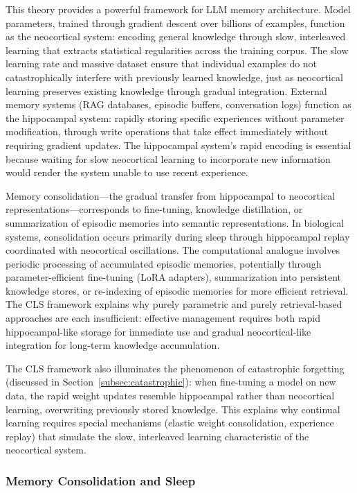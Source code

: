 \documentclass[11pt,letterpaper]{article}
\begin{document}
This theory provides a powerful framework for LLM memory architecture. Model parameters, trained through gradient descent over billions of examples, function as the neocortical system: encoding general knowledge through slow, interleaved learning that extracts statistical regularities across the training corpus. The slow learning rate and massive dataset ensure that individual examples do not catastrophically interfere with previously learned knowledge, just as neocortical learning preserves existing knowledge through gradual integration. External memory systems (RAG databases, episodic buffers, conversation logs) function as the hippocampal system: rapidly storing specific experiences without parameter modification, through write operations that take effect immediately without requiring gradient updates. The hippocampal system's rapid encoding is essential because waiting for slow neocortical learning to incorporate new information would render the system unable to use recent experience.

Memory consolidation---the gradual transfer from hippocampal to neocortical representations---corresponds to fine-tuning, knowledge distillation, or summarization of episodic memories into semantic representations. In biological systems, consolidation occurs primarily during sleep through hippocampal replay coordinated with neocortical oscillations. The computational analogue involves periodic processing of accumulated episodic memories, potentially through parameter-efficient fine-tuning (LoRA adapters), summarization into persistent knowledge stores, or re-indexing of episodic memories for more efficient retrieval. The CLS framework explains why purely parametric and purely retrieval-based approaches are each insufficient: effective management requires both rapid hippocampal-like storage for immediate use and gradual neocortical-like integration for long-term knowledge accumulation.

The CLS framework also illuminates the phenomenon of catastrophic forgetting (discussed in Section~\ref{subsec:catastrophic}): when fine-tuning a model on new data, the rapid weight updates resemble hippocampal rather than neocortical learning, overwriting previously stored knowledge. This explains why continual learning requires special mechanisms (elastic weight consolidation, experience replay) that simulate the slow, interleaved learning characteristic of the neocortical system.

\subsubsection{Memory Consolidation and Sleep}
\end{document}
